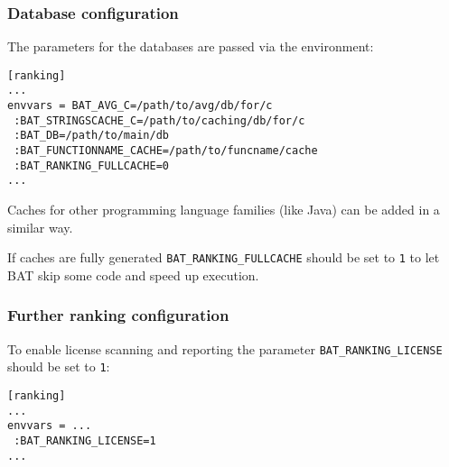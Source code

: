 \documentclass[11pt]{beamer}
\begin{document}
\begin{frame}[fragile]
\frametitle{Database configuration}
The parameters for the databases are passed via the environment:

\begin{verbatim}
[ranking]
...
envvars = BAT_AVG_C=/path/to/avg/db/for/c
 :BAT_STRINGSCACHE_C=/path/to/caching/db/for/c
 :BAT_DB=/path/to/main/db
 :BAT_FUNCTIONNAME_CACHE=/path/to/funcname/cache
 :BAT_RANKING_FULLCACHE=0
...
\end{verbatim}

Caches for other programming language families (like Java) can be added in a similar way.

If caches are fully generated \texttt{BAT\_RANKING\_FULLCACHE} should be set to \texttt{1} to let BAT skip some code and speed up execution.
\end{frame}

\begin{frame}[fragile]
\frametitle{Further ranking configuration}
To enable license scanning and reporting the parameter \texttt{BAT\_RANKING\_LICENSE} should be set to \texttt{1}:

\begin{verbatim}
[ranking]
...
envvars = ...
 :BAT_RANKING_LICENSE=1
...
\end{verbatim}
\end{frame}

\end{document}
